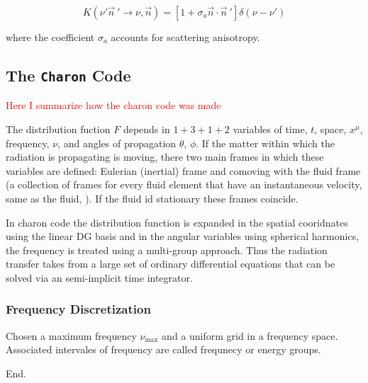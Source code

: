 \documentclass[11pt,a4paper,headinclude=true,DIV=14,BCOR=8mm,chapterprefix,listof=totoc,twoside,openright,abstracton]{scrbook}
\begin{document}
\begin{equation}
    K(\nu'\vec{n}\: '\rightarrow\nu,\vec{n}) = [1 + \sigma_a\vec{n}\cdot\vec{n}\: ']\delta(\nu-\nu')
\end{equation}

where the coefficient $\sigma_a$ accounts for scattering anisotropy. 

\subsection{The \texttt{Charon} Code}
\textcolor{red}{Here I summarize how the charon code was made}

The distribution fuction $F$ depends in $1+3+1+2$ variables of time, $t$, space, $x^{\mu}$, frequency, $\nu$, and angles of propagation $\theta$, $\phi$. If the matter within which the radiation is propagating is moving, there two main frames in which these variables are defined: Eulerian (inertial) frame and comoving with the fluid frame (a collection of frames for every fluid element that have an instantaneous velocity, same as the fluid, \cite{Mihalas:1984,Hubeny:2006wm}). If the fluid id stationary these frames coincide.

In charon code the distribution function is expanded in the spatial cooridnates using the linear DG basis and in the angular variables using spherical harmonics, the frequency is treated using a multi-group approach. Thus the radiation transfer takes from a large set of ordinary differential equations that can be solved via an semi-implicit time integrator. 

\subsubsection{Frequency Discretization}
Chosen a maximum frequency $\nu_{\text{max}}$ and a uniform grid in a frequency space. Associated intervales of frequency are called frequnecy or energy groups. 

End.
\end{document}
